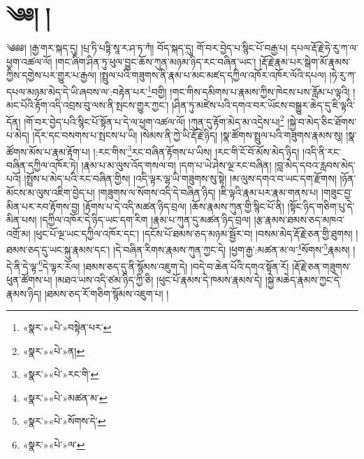 \chapter{༄༅། །}༄༅༅། །རྒྱ་གར་སྐད་དུ། །པྲ་ཏི་པཏྟི་སཱ་ར་ཤ་ཏ་ཀཾ། བོད་སྐད་དུ། གོ་བར་བྱེད་པ་སྙིང་པོ་བརྒྱ་པ། དཔལ་རྡོ་རྗེ་ཧེ་རུ་ཀ་ལ་ཕྱག་འཚལ་ལོ། །གང་ཞིག་ཤིན་ཏུ་ཕུལ་བྱུང་ཆོས་ཀུན་མཉམ་ཉིད་རང་བཞིན་ཡང་། །རྡོ་རྗེ་རྣམ་པར་སྒེག་མོ་རྣམས་ཀྱིས་དགྱེས་པར་གྱུར་པ་རྒྱལ། །སྤྲུལ་པའི་གཟུགས་ནི་རྣམ་པ་མང་མཛད་དཀྱིལ་འཁོར་འཁོར་ལོའི་དཔལ། །ཧེ་རུ་ཀ་དཔལ་མཉམ་མེད་དེ་ཡི་ཞབས་ལ་:བརྟེན་པར་\footnote{«སྣར་»«པེ་»བསྟེན་པར་}བགྱི། །གང་གིས་དམིགས་པ་རྣམས་ཀྱིས་ཁེངས་པས་རློམ་པ་ལྟའི། །མང་པོའི་རྟོག་འདི་འབྲས་བུ་ལས་ནི་སྤངས་གྱུར་ཀྱང་། །ཤིན་ཏུ་མཛེས་པའི་དགའ་བར་ཡོངས་བསྒྱུར་ཆེད་དུ་ཇི་ལྟའི་དོན། །གོ་བར་བྱེད་པའི་སྙིང་པོ་སྟོན་པ་དེ་ལ་ཕྱག་འཚལ་ལོ། །ཀུན་དུ་རྟོག་མེད་མ་འདྲེས་པ།\footnote{«སྣར་»«པེ་»ན།} །སྐྱེ་བ་མེད་ཅིང་ཐོགས་པ་མེད། །དོར་དང་བསགས་པ་སྤངས་པ་ཡི། །སེམས་ནི་ཀྱེ་ཡི་རྡོ་རྗེ་ཉིད། །སྣ་ཚོགས་སྤྲུལ་པའི་གཟུགས་རྣམས་སུ། །སྣ་ཚོགས་མོས་པ་རྣམ་རྟོག་པ། །:རང་གིས་\footnote{«སྣར་»«པེ་»རང་གི་}རང་བཞིན་རྟོགས་པ་ཡིས། །རང་གི་ངོ་བོ་མོས་མེད་ཉིད། །འདི་ནི་རང་བཞིན་དཀྱིལ་འཁོར་ཏེ། །རྣམ་པ་མ་ལུས་འོད་གསལ་བ། །དག་པ་ཡེ་ཤེས་ལྔ་རང་བཞིན། །བླ་མེད་དབའ་རླབས་མེད་པའོ། །སྤྲོས་པ་མེད་པའི་རང་བཞིན་གྱིས། །འདི་ལྟར་ལྷ་ཡི་གཟུགས་སུ་སྟེ། །མ་ལུས་དགའ་བ་ཡང་དག་རྫོགས། །ཉོན་མོངས་མ་ལུས་འཇིག་བྱེད་པ། །གཟུགས་ལ་སོགས་འདི་དེ་བཞིན་ཉིད། །ཇི་ལྟའི་རྣམ་པར་རྣམ་གནས་པ། །གཟུང་བྱ་མིན་པར་རབ་རྟོགས་བྱ། །རྟོགས་པ་དེ་འདི་མཚན་ཉིད་བྲལ། །ཆོས་རྣམས་ཀུན་གྱི་སྙིང་པོ་ནི། །སྟོང་ཉིད་གཅིག་པུ་དེ་མིན་པས། །དཀྱིལ་འཁོར་དེ་ཉིད་ཡང་དག་རིག །རྣམ་པ་ཀུན་དུ་མཚན་ཉིད་བྲལ། །རྩ་རྣམས་ཐམས་ཅད་མཁའ་འགྲོ་མ། །ཕུང་པོ་ལྔ་ཡང་དཀྱིལ་འཁོར་དང་། །དངོས་པོ་ཐམས་ཅད་མཉམ་སྦྱོར་བ། །བསམ་མེད་རྡོ་རྗེ་ཅན་གྱི་ཐུགས། །ཐམས་ཅད་དུ་ཡང་སྐུ་རྣམས་དང་། །དེ་བཞིན་རིགས་རྣམས་ཀུན་ཀྱང་དེ། །ཕྱག་རྒྱ་:མཚན་མ་ལ་\footnote{«སྣར་»«པེ་»མཚན་མ་}སོགས་\footnote{«སྣར་»«པེ་»སོགས་དེ་}རྣམས། །དེ་ནི་དེ་ལྟ་\footnote{«སྣར་»«པེ་»ལ་}དེ་ལྟར་རོལ། །ཐམས་ཅད་དུ་ནི་སྙོམས་འཇུག་དེ། །བདེ་བ་ཆེན་པོའི་དགའ་སྟོན་རོ། །རྡོ་རྗེ་ཅན་གཟུགས་ཕུན་ཚོགས་པ། །མཐའ་ཡས་འདི་ཙམ་ཉིད་ཀྱི་ཅི། །ཕུང་པོ་རྣམས་དེ་ཁམས་རྣམས་དེ། །སྐྱེ་མཆེད་རྣམས་ཀྱང་དེ་རྣམས་ཉིད། །ཐམས་ཅད་རོ་གཅིག་སྙོམས་འཇུག་པ། །

